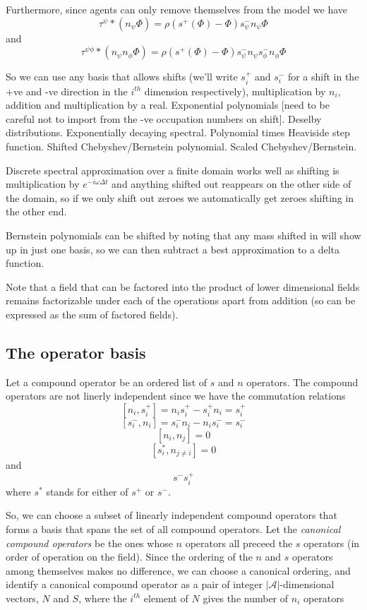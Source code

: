 \documentclass[a4paper]{article}
\begin{document}
Furthermore, since agents can only remove themselves from the model we have
\[
\tau^\psi \ast (n_\psi\Phi) = \rho(s^+(\Phi) - \Phi)s^-_\psi n_\psi \Phi 
\]
and
\[
\tau^{\psi\phi} \ast (n_\psi n_\phi \Phi) = \rho(s^+(\Phi) - \Phi)s^-_\psi n_\psi s^-_\phi n_\phi \Phi 
\]


So we can use any basis that allows shifts (we'll write $s^+_i$ and $s^-_i$ for a shift in the +ve and -ve direction in the $i^{th}$ dimension respectively), multiplication by $n_i$, addition and multiplication by a real. Exponential polynomials [need to be careful not to import from the -ve occupation numbers on shift]. Deselby distributions. Exponentially decaying spectral. Polynomial times Heaviside step function. Shifted Chebyshev/Bernstein polynomial. Scaled Chebyshev/Bernstein.

Discrete spectral approximation over a finite domain works well as shifting is multiplication by $e^{-i\omega \Delta t}$ and anything shifted out reappears on the other side of the domain, so if we only shift out zeroes we automatically get zeroes shifting in the other end.

Bernstein polynomials can be shifted by noting that any mass shifted in will show up in just one basis, so we can then subtract a best approximation to a delta function.

Note that a field that can be factored into the product of lower dimensional fields remains factorizable under each of the operations apart from addition (so can be expressed as the sum of factored fields).

\subsection{The operator basis}

Let a compound operator be an ordered list of $s$ and $n$ operators. The compound operators are not linerly independent since we have the commutation relations
\[
[n_i,s^+_i] = n_i s^+_i - s^+_i n_i = s^+_i  
\]
\[
[s^-_i, n_i] = s^-_i n_i - n_i s^-_i = s^-_i  
\]
\[
[n_i, n_j] = 0
\]
\[
[s^*_i, n_{j \ne i}] = 0
\]
and
\[
s^-s^+_i
\]
where $s^*$ stands for either of $s^+$ or $s^-$.

So, we can choose a subset of linearly independent compound operators that forms a basis that spans the set of all compound operators. Let the \textit{canonical compound operators} be the ones whose $n$ operators all preceed the $s$ operators (in order of operation on the field). Since the ordering of the $n$ and $s$ operators among themselves makes no difference, we can choose a canonical ordering, and identify a canonical compound operator as a pair of integer $|\mathcal{A}|$-dimensional vectors, $N$ and $S$, where the $i^{th}$ element of $N$ gives the number of $n_i$ operators
\end{document}
